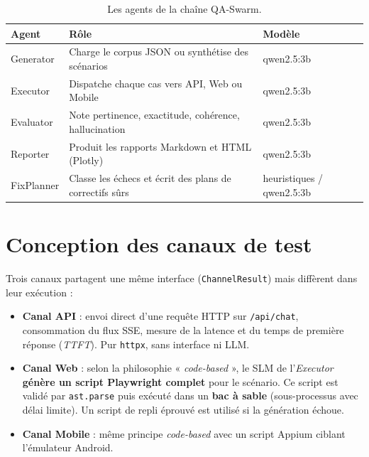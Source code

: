 \documentclass[12pt,a4paper,oneside]{report}
\begin{document}
\begin{table}[H]
\centering
\caption{Les agents de la chaîne QA-Swarm.}
\label{tab:agents}
\renewcommand{\arraystretch}{1.3}
\begin{tabularx}{\textwidth}{@{}l X l@{}}
\toprule
\textbf{Agent} & \textbf{Rôle} & \textbf{Modèle} \\
\midrule
Generator & Charge le corpus JSON ou synthétise des scénarios & qwen2.5:3b \\
Executor & Dispatche chaque cas vers API, Web ou Mobile & qwen2.5:3b \\
Evaluator & Note pertinence, exactitude, cohérence, hallucination & qwen2.5:3b \\
Reporter & Produit les rapports Markdown et HTML (Plotly) & qwen2.5:3b \\
FixPlanner & Classe les échecs et écrit des plans de correctifs sûrs & heuristiques / qwen2.5:3b \\
\bottomrule
\end{tabularx}
\end{table}

\section{Conception des canaux de test}
Trois canaux partagent une même interface (\texttt{ChannelResult}) mais diffèrent dans
leur exécution :
\begin{itemize}[leftmargin=*]
  \item \textbf{Canal API} : envoi direct d'une requête HTTP sur \texttt{/api/chat},
  consommation du flux SSE, mesure de la latence et du temps de première réponse
  (\textit{TTFT}). Pur \texttt{httpx}, sans interface ni LLM.
  \item \textbf{Canal Web} : selon la philosophie « \textit{code-based} », le SLM de
  l'\textit{Executor} \textbf{génère un script Playwright complet} pour le scénario.
  Ce script est validé par \texttt{ast.parse} puis exécuté dans un \textbf{bac à sable}
  (sous-processus avec délai limite). Un script de repli éprouvé est utilisé si la
  génération échoue.
  \item \textbf{Canal Mobile} : même principe \textit{code-based} avec un script Appium
  ciblant l'émulateur Android.
\end{itemize}
\end{document}

